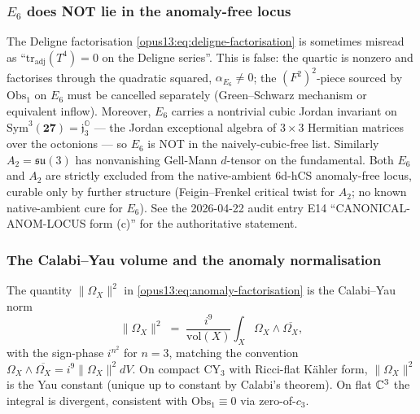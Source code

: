 \subsubsection{$E_6$ does NOT lie in the anomaly-free locus}

\begin{remark}[$E_6$ status]\ClaimStatusRemark
\label{opus13:rem:E6}
The Deligne factorisation \eqref{opus13:eq:deligne-factorisation} is
sometimes misread as ``$\mathrm{tr}_{\mathrm{adj}}(T^4) = 0$ on the
Deligne series''. This is false: the quartic is nonzero and
factorises through the quadratic squared, $\alpha_{E_6} \neq 0$; the
$(F^2)^2$-piece sourced by $\mathrm{Obs}_1$ on $E_6$ must be cancelled
separately (Green--Schwarz mechanism or equivalent inflow). Moreover,
$E_6$ carries a nontrivial cubic Jordan invariant on
$\mathrm{Sym}^3(\mathbf{27}) = \mathfrak{j}_3^{\mathbb O}$ — the
Jordan exceptional algebra of $3\times 3$ Hermitian matrices over the
octonions — so $E_6$ is NOT in the naively-cubic-free list. Similarly
$A_2 = \mathfrak{su}(3)$ has nonvanishing Gell-Mann $d$-tensor on the
fundamental. Both $E_6$ and $A_2$ are strictly excluded from the
native-ambient 6d-hCS anomaly-free locus, curable only by further
structure (Feigin--Frenkel critical twist for $A_2$; no known
native-ambient cure for $E_6$). See the 2026-04-22 audit entry E14
``CANONICAL-ANOM-LOCUS form (c)'' for the authoritative statement.
\end{remark}

\subsubsection{The Calabi--Yau volume and the anomaly normalisation}

\begin{proposition}\ClaimStatusProposition
\label{opus13:prop:omega-norm}
The quantity $\|\Omega_X\|^2$ in \eqref{opus13:eq:anomaly-factorisation}
is the Calabi--Yau norm
\[
  \|\Omega_X\|^2 \;=\; \frac{i^9}{\mathrm{vol}(X)}
  \int_X \Omega_X \wedge \overline{\Omega_X},
\]
with the sign-phase $i^{n^2}$ for $n = 3$, matching the convention
$\Omega_X\wedge\overline{\Omega_X} = i^9 \|\Omega_X\|^2 dV$. On compact
CY$_3$ with Ricci-flat Kähler form, $\|\Omega_X\|^2$ is the Yau constant
(unique up to constant by Calabi's theorem). On flat $\mathbb{C}^3$ the
integral is divergent, consistent with $\mathrm{Obs}_1 \equiv 0$ via
zero-of-$c_3$.
\end{proposition}



